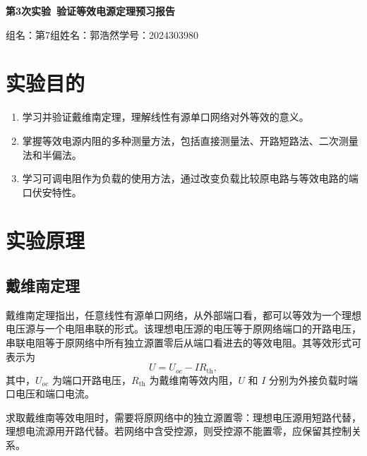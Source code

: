 \documentclass[12pt]{ctexart}
\begin{document}
\thispagestyle{empty}

\begin{center}
    \LARGE\textbf{第3次实验\ 验证等效电源定理预习报告}

    \vspace{1cm}
    \normalsize
    组名：第7组\quad 姓名：郭浩然\quad 学号：2024303980
\end{center}

\vspace{1cm}


\section{实验目的}

\begin{enumerate}[label=\arabic*.]
    \item 学习并验证戴维南定理，理解线性有源单口网络对外等效的意义。
    \item 掌握等效电源内阻的多种测量方法，包括直接测量法、开路短路法、二次测量法和半偏法。
    \item 学习可调电阻作为负载的使用方法，通过改变负载比较原电路与等效电路的端口伏安特性。
\end{enumerate}

\section{实验原理}

\subsection{戴维南定理}

戴维南定理指出，任意线性有源单口网络，从外部端口看，都可以等效为一个理想电压源与一个电阻串联的形式。该理想电压源的电压等于原网络端口的开路电压，串联电阻等于原网络中所有独立源置零后从端口看进去的等效电阻。其等效形式可表示为
\begin{equation}
    U = U_{oc} - I R_{\mathrm{th}},
\end{equation}
其中，\(U_{oc}\) 为端口开路电压，\(R_{\mathrm{th}}\) 为戴维南等效内阻，\(U\) 和 \(I\) 分别为外接负载时端口电压和端口电流。

求取戴维南等效电阻时，需要将原网络中的独立源置零：理想电压源用短路代替，理想电流源用开路代替。若网络中含受控源，则受控源不能置零，应保留其控制关系。
\end{document}
